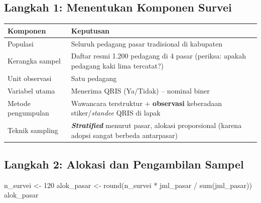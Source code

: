 \documentclass[
  indonesian,
  letterpaper,
]{book}
\newenvironment{Shaded}{\begin{snugshade}}{\end{snugshade}}
\newcommand{\DecValTok}[1]{\textcolor[rgb]{0.68,0.00,0.00}{#1}}
\newcommand{\FunctionTok}[1]{\textcolor[rgb]{0.28,0.35,0.67}{#1}}
\newcommand{\NormalTok}[1]{\textcolor[rgb]{0.00,0.23,0.31}{#1}}
\newcommand{\OtherTok}[1]{\textcolor[rgb]{0.00,0.23,0.31}{#1}}
\newcommand{\SpecialCharTok}[1]{\textcolor[rgb]{0.37,0.37,0.37}{#1}}
\newcounter{none} %
\begin{document}
\subsection{Langkah 1: Menentukan Komponen
Survei}\label{langkah-1-menentukan-komponen-survei}

{\def\LTcaptype{none} %
\begin{longtable}[]{@{}
  >{\raggedright\arraybackslash}p{}
  >{\raggedright\arraybackslash}p{}@{}}
\toprule\noalign{}
\begin{minipage}[b]{\linewidth}\raggedright
Komponen
\end{minipage} & \begin{minipage}[b]{\linewidth}\raggedright
Keputusan
\end{minipage} \\
\midrule\noalign{}
\endhead
\bottomrule\noalign{}
\endlastfoot
Populasi & Seluruh pedagang pasar tradisional di kabupaten \\
Kerangka sampel & Daftar resmi 1.200 pedagang di 4 pasar (periksa:
apakah pedagang kaki lima tercatat?) \\
Unit observasi & Satu pedagang \\
Variabel utama & Menerima QRIS (Ya/Tidak) -- nominal biner \\
Metode pengumpulan & Wawancara terstruktur + \textbf{observasi}
keberadaan stiker/\emph{standee} QRIS di lapak \\
Teknik sampling & \textbf{\emph{Stratified}} menurut pasar, alokasi
proporsional (karena adopsi sangat berbeda antarpasar) \\
\end{longtable}
}

\subsection{Langkah 2: Alokasi dan Pengambilan
Sampel}\label{langkah-2-alokasi-dan-pengambilan-sampel}

\begin{Shaded}
\begin{Highlighting}[]
\NormalTok{n\_survei }\OtherTok{\textless{}{-}} \DecValTok{120}
\NormalTok{alok\_pasar }\OtherTok{\textless{}{-}} \FunctionTok{round}\NormalTok{(n\_survei }\SpecialCharTok{*}\NormalTok{ jml\_pasar }\SpecialCharTok{/} \FunctionTok{sum}\NormalTok{(jml\_pasar))}
\NormalTok{alok\_pasar}
\end{Highlighting}
\end{Shaded}
\end{document}
